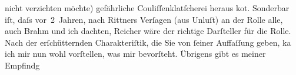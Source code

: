\begin{ledgroupsized}[t]{13cm}
               nicht verzichten möchte) gefährliche Couliſſenklatſcherei heraus ko{\geminationm}t. Sonderbar iſt, daſs vor 2 Jahren, nach Rittners Verſagen (aus Unluſt) an der Rolle
               alle, auch Brahm und ich dachten, Reicher wäre der richtige Darſteller für die
               Rolle. Nach der erſchütternden Charakteriſtik, die Sie von ſeiner Auffaſſung geben,
                  ka{\geminationn} ich mir nun wohl vorſtellen, was mir {\pb}bevorſteht. Übrigens gibt es meiner Empfindg

\end{ledgroupsized}
